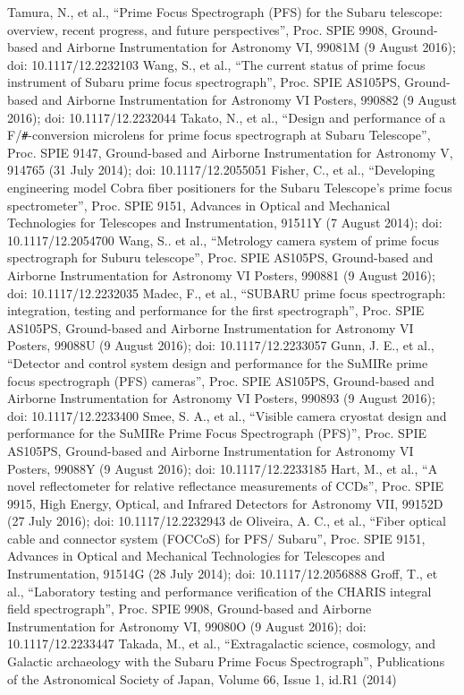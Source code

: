 \documentclass[a4paper]{article}
\begin{document}
\begin{thebibliography}{99}
 Tamura, N., et al., ``Prime Focus Spectrograph (PFS) for the Subaru telescope: overview, recent progress, and future perspectives'', Proc. SPIE 9908, Ground-based and Airborne Instrumentation for Astronomy VI, 99081M (9 August 2016); doi: 10.1117/12.2232103
 Wang, S., et al., ``The current status of prime focus instrument of Subaru prime focus spectrograph'', Proc. SPIE AS105PS, Ground-based and Airborne Instrumentation for Astronomy VI Posters, 990882 (9 August 2016); doi: 10.1117/12.2232044
 Takato, N., et al., ``Design and performance of a F/\verb|#|-conversion microlens for prime focus spectrograph at Subaru Telescope'', Proc. SPIE 9147, Ground-based and Airborne Instrumentation for Astronomy V, 914765 (31 July 2014); doi: 10.1117/12.2055051
 Fisher, C., et al., ``Developing engineering model Cobra fiber positioners for the Subaru Telescope’s prime focus spectrometer'', Proc. SPIE 9151, Advances in Optical and Mechanical Technologies for Telescopes and Instrumentation, 91511Y (7 August 2014); doi: 10.1117/12.2054700
 Wang, S.. et al., ``Metrology camera system of prime focus spectrograph for Suburu telescope'', Proc. SPIE AS105PS, Ground-based and Airborne Instrumentation for Astronomy VI Posters, 990881 (9 August 2016); doi: 10.1117/12.2232035
 Madec, F., et al., ``SUBARU prime focus spectrograph: integration, testing and performance for the first spectrograph'', Proc. SPIE AS105PS, Ground-based and Airborne Instrumentation for Astronomy VI Posters, 99088U (9 August 2016); doi: 10.1117/12.2233057
 Gunn, J. E., et al., ``Detector and control system design and performance for the SuMIRe prime focus spectrograph (PFS) cameras'', Proc. SPIE AS105PS, Ground-based and Airborne Instrumentation for Astronomy VI Posters, 990893 (9 August 2016); doi: 10.1117/12.2233400
 Smee, S. A., et al., ``Visible camera cryostat design and performance for the SuMIRe Prime Focus Spectrograph (PFS)'', Proc. SPIE AS105PS, Ground-based and Airborne Instrumentation for Astronomy VI Posters, 99088Y (9 August 2016); doi: 10.1117/12.2233185
 Hart, M., et al., ``A novel reflectometer for relative reflectance measurements of CCDs'', Proc. SPIE 9915, High Energy, Optical, and Infrared Detectors for Astronomy VII, 99152D (27 July 2016); doi: 10.1117/12.2232943
 de Oliveira, A. C., et al., ``Fiber optical cable and connector system (FOCCoS) for PFS/ Subaru'', Proc. SPIE 9151, Advances in Optical and Mechanical Technologies for Telescopes and Instrumentation, 91514G (28 July 2014); doi: 10.1117/12.2056888
 Groff, T., et al., ``Laboratory testing and performance verification of the CHARIS integral field spectrograph'', Proc. SPIE 9908, Ground-based and Airborne Instrumentation for Astronomy VI, 99080O (9 August 2016); doi: 10.1117/12.2233447
 Takada, M., et al., ``Extragalactic science, cosmology, and Galactic archaeology with the Subaru Prime Focus Spectrograph'', Publications of the Astronomical Society of Japan, Volume 66, Issue 1, id.R1 (2014)
\end{thebibliography}
\end{document}
